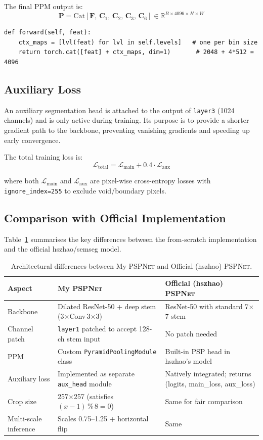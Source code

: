 \documentclass[12pt,a4paper]{article}
\newcommand{\code}[1]{\texttt{#1}}
\newcommand{\pspnet}{\textsc{PSPNet}}
\newcommand{\mypsp}{My \pspnet{}}
\newcommand{\offpsp}{Official (hszhao) \pspnet{}}
\begin{document}
The final PPM output is:
\[
    \mathbf{P} = \text{Cat}\!\left[\mathbf{F},\, \mathbf{C}_1,\, \mathbf{C}_2,\, \mathbf{C}_3,\, \mathbf{C}_6\right]
    \in \mathbb{R}^{B \times 4096 \times H \times W}
\]

\begin{lstlisting}[caption={PyramidPoolingModule forward pass.}]
def forward(self, feat):
    ctx_maps = [lvl(feat) for lvl in self.levels]   # one per bin size
    return torch.cat([feat] + ctx_maps, dim=1)       # 2048 + 4*512 = 4096
\end{lstlisting}

\subsection{Auxiliary Loss}

An auxiliary segmentation head is attached to the output of \code{layer3}
(1024 channels) and is only active during training.  Its purpose is to provide
a shorter gradient path to the backbone, preventing vanishing gradients and
speeding up early convergence.

The total training loss is:
\[
    \mathcal{L}_{\text{total}} = \mathcal{L}_{\text{main}} + 0.4 \cdot \mathcal{L}_{\text{aux}}
\]

where both $\mathcal{L}_{\text{main}}$ and $\mathcal{L}_{\text{aux}}$ are
pixel-wise cross-entropy losses with \code{ignore\_index=255} to exclude
void/boundary pixels.

\subsection{Comparison with Official Implementation}

Table~\ref{tab:compare_arch} summarises the key differences between the
from-scratch implementation and the official hszhao/semseg model.

\begin{table}[H]
\centering
\caption{Architectural differences between \mypsp{} and \offpsp{}.}
\label{tab:compare_arch}
\begin{tabularx}{\linewidth}{lXX}
\toprule
\textbf{Aspect} & \textbf{\mypsp{}} & \textbf{\offpsp{}} \\
\midrule
Backbone       & Dilated ResNet-50 + deep stem (3$\times$Conv\,3$\times$3) & ResNet-50 with standard 7$\times$7 stem \\
Channel patch  & \code{layer1} patched to accept 128-ch stem input & No patch needed \\
PPM            & Custom \code{PyramidPoolingModule} class & Built-in PSP head in hszhao's model \\
Auxiliary loss & Implemented as separate \code{aux\_head} module & Natively integrated; returns (logits, main\_loss, aux\_loss) \\
Crop size      & 257$\times$257 (satisfies $(x-1)\,\%\,8 = 0$) & Same for fair comparison \\
Multi-scale inference & Scales 0.75--1.25 + horizontal flip & Same \\
\bottomrule
\end{tabularx}
\end{table}
\end{document}
